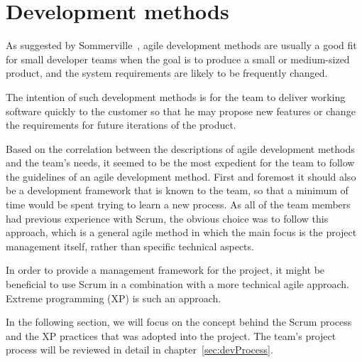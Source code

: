 \section{Development methods}

As suggested by Sommerville~\cite{scrum}, agile development methods are usually a good fit for small developer teams when the goal is to produce a small or medium-sized product, and the system requirements are likely to be frequently changed.

The intention of such development methods is for the team to deliver working software quickly to the customer so that he may propose new features or change the requirements for future iterations of the product.

Based on the correlation between the descriptions of agile development methods and the team's needs, it seemed to be the most expedient for the team to follow the guidelines of an agile development method. First and foremost it should also be a development framework that is known to the team, so that a minimum of time would be spent trying to learn a new process. As all of the team members had previous experience with Scrum, the obvious choice was to follow this approach, which is a general agile method in which the main focus is the project management itself, rather than specific technical aspects.

In order to provide a management framework for the project, it might be beneficial to use Scrum in a combination with a more technical agile approach. Extreme programming (XP) is such an approach.

In the following section, we will focus on the concept behind the Scrum process and the XP practices that was adopted into the project. The team's project process will be reviewed in detail in chapter~\ref{sec:devProcess}.